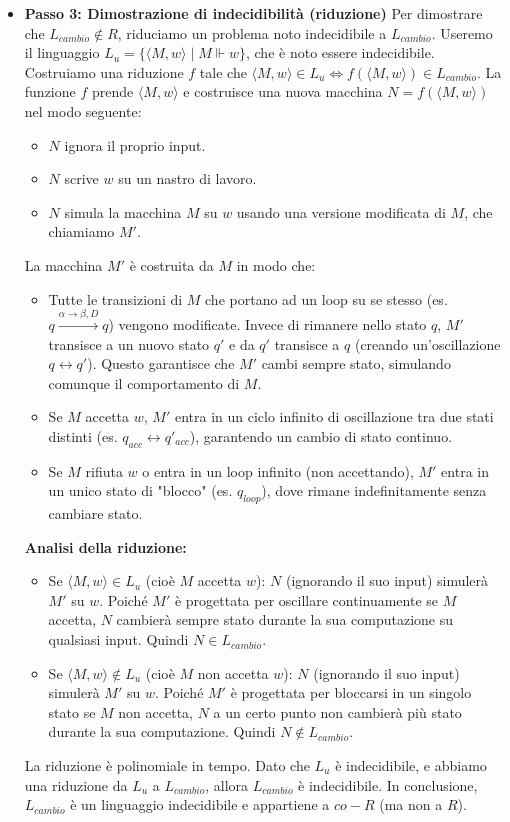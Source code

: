 \documentclass[a4paper]{article}
\theoremstyle{definition} %
\begin{document}
\begin{itemize}
    \item \textbf{Passo 3: Dimostrazione di indecidibilità (riduzione)}
    Per dimostrare che $L_{cambio} \notin R$, riduciamo un problema noto indecidibile a $L_{cambio}$. Useremo il linguaggio $L_u = \{ \langle M, w \rangle \mid M \Vdash w \}$, che è noto essere indecidibile.
    Costruiamo una riduzione $f$ tale che $\langle M, w \rangle \in L_u \iff f(\langle M, w \rangle) \in L_{cambio}$.
    La funzione $f$ prende $\langle M, w \rangle$ e costruisce una nuova macchina $N = f(\langle M, w \rangle)$ nel modo seguente:
    \begin{itemize}
        \item $N$ ignora il proprio input.
        \item $N$ scrive $w$ su un nastro di lavoro.
        \item $N$ simula la macchina $M$ su $w$ usando una versione modificata di $M$, che chiamiamo $M'$.
    \end{itemize}
    La macchina $M'$ è costruita da $M$ in modo che:
    \begin{itemize}
        \item Tutte le transizioni di $M$ che portano ad un loop su se stesso (es. $q \xrightarrow{\alpha \to \beta, D} q$) vengono modificate. Invece di rimanere nello stato $q$, $M'$ transisce a un nuovo stato $q'$ e da $q'$ transisce a $q$ (creando un'oscillazione $q \leftrightarrow q'$). Questo garantisce che $M'$ cambi sempre stato, simulando comunque il comportamento di $M$.
        \item Se $M$ accetta $w$, $M'$ entra in un ciclo infinito di oscillazione tra due stati distinti (es. $q_{acc} \leftrightarrow q'_{acc}$), garantendo un cambio di stato continuo.
        \item Se $M$ rifiuta $w$ o entra in un loop infinito (non accettando), $M'$ entra in un unico stato di "blocco" (es. $q_{loop}$), dove rimane indefinitamente senza cambiare stato.
    \end{itemize}

    \textbf{Analisi della riduzione:}
    \begin{itemize}
        \item Se $\langle M, w \rangle \in L_u$ (cioè $M$ accetta $w$):
        $N$ (ignorando il suo input) simulerà $M'$ su $w$. Poiché $M'$ è progettata per oscillare continuamente se $M$ accetta, $N$ cambierà sempre stato durante la sua computazione su qualsiasi input. Quindi $N \in L_{cambio}$.

        \item Se $\langle M, w \rangle \notin L_u$ (cioè $M$ non accetta $w$):
        $N$ (ignorando il suo input) simulerà $M'$ su $w$. Poiché $M'$ è progettata per bloccarsi in un singolo stato se $M$ non accetta, $N$ a un certo punto non cambierà più stato durante la sua computazione. Quindi $N \notin L_{cambio}$.
    \end{itemize}
    La riduzione è polinomiale in tempo. Dato che $L_u$ è indecidibile, e abbiamo una riduzione da $L_u$ a $L_{cambio}$, allora $L_{cambio}$ è indecidibile.
    In conclusione, $L_{cambio}$ è un linguaggio indecidibile e appartiene a $co-R$ (ma non a $R$).
\end{itemize}
\end{document}
